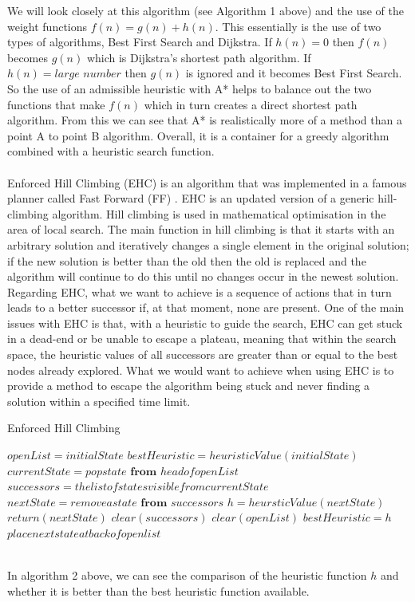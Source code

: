 We will look closely at this algorithm (see Algorithm 1 above) and the use of the weight functions $f(n) = g(n) + h(n)$. This essentially is the use of two types of algorithms, Best First Search and Dijkstra. If $h(n) = 0$ then $f(n)$ becomes $g(n)$ which is Dijkstra's shortest path algorithm. If $h(n) = \textit{large number}$ then $g(n)$ is ignored and it becomes Best First Search. So the use of an admissible heuristic with A* helps to balance out the two functions that make $f(n)$ which in turn creates a direct shortest path algorithm.\cite{InformedSearch}
From this we can see that A* is realistically more of a method than a point A to point B algorithm. Overall, it is a container for a greedy algorithm combined with a heuristic search function.  
\\
\\
Enforced Hill Climbing (EHC) is an algorithm that was implemented in a famous planner called Fast Forward (FF) \cite{FFPlanner}. EHC is an updated version of a generic hill-climbing algorithm. Hill climbing is used in mathematical optimisation in the area of local search. The main function in hill climbing is that it starts with an arbitrary solution and iteratively changes a single element in the original solution; if the new solution is better than the old then the old is replaced and the algorithm will continue to do this until no changes occur in the newest solution. 
Regarding EHC, what we want to achieve is a sequence of actions that in turn leads to a better successor if, at that moment, none are present. One of the main issues with EHC is that, with a heuristic to guide the search, EHC can get stuck in a dead-end or be unable to escape a plateau, meaning that within the search space, the heuristic values of all successors are greater than or equal to the best nodes already explored\cite{PlateauEHC}. What we would want to achieve when using EHC is to provide a method to escape the algorithm being stuck and never finding a solution within a specified time limit. 
\\ 
\begin{algorithm}
\caption{Enforced Hill Climbing}
\begin{algorithmic}
\State $openList = initialState$
\State $bestHeuristic = heuristicValue(initialState)$
\State $currentState = pop state \textbf{ from } head of openList$ 
\State $ successors = the list of states visible from currentState$ 
\State $nextState = remove a state \textbf{ from } successors$
\State $h = heursticValue(nextState)$
\State $return(nextState)$
\EndIf
{}
\State $clear(successors)$
\State $clear(openList)$
\State $bestHeuristic = h$
\EndIf
\State $place next state at back of open list$
\EndWhile
\EndWhile
\end{algorithmic}
\end{algorithm}
\\
In algorithm 2 above, we can see the comparison of the heuristic function $h$ and whether it is better than the best heuristic function available. 
